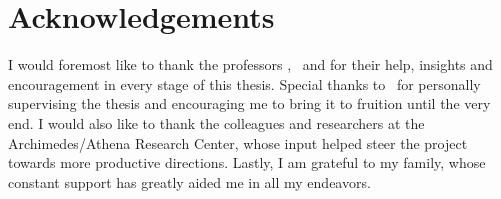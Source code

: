 %
\chapter*{Acknowledgements}
\label{sec:acknowledgements}
\vspace*{-10mm}

I would foremost like to thank the professors \thesisSupervisor, \thesisReviewerOne \ and \thesisReviewerTwo for their help, insights and encouragement in every stage of this thesis. Special thanks to \thesisSupervisorTitle  \thesisSupervisor \ for personally supervising the thesis and encouraging me to bring it to fruition until the very end. I would also like to thank the colleagues and researchers at the Archimedes/Athena Research Center, whose input helped steer the project towards more productive directions. Lastly, I am grateful to my family, whose constant support has greatly aided me in all my endeavors. 